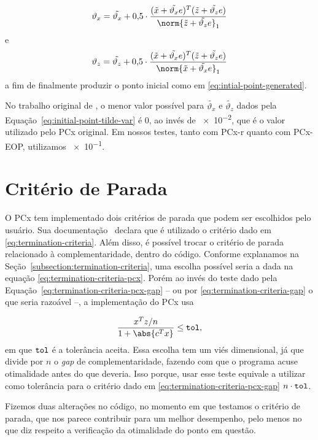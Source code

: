 \begin{equation}
	\label{eq:initial-point-var-x}
\vartheta_{x} = \tilde{\vartheta_x} + \num{0.5}\cdot\dfrac{(\xtil+\tilde{\vartheta_x} e)^{T}(\ztil+\tilde{\vartheta_z} e)}{\norm{\ztil+\tilde{\vartheta_z} e}_{1}} 
\end{equation}
e
\begin{equation}
	\label{eq:initial-point-var-z}
\vartheta_{z} = \tilde{\vartheta_z} + \num{0.5}\cdot\dfrac{(\xtil+\tilde{\vartheta_x} e)^{T}(\ztil+\tilde{\vartheta_z} e)}{\norm{\xtil+\tilde{\vartheta_x} e}_{1}} 
\end{equation}
a fim de finalmente produzir o ponto inicial como em \eqref{eq:intial-point-generated}.

No trabalho original de \textcite{Mehrotra:1992wr}, o menor valor possível para  $\tilde{\vartheta_x}$ e $\tilde{\vartheta_z}$ dados pela Equação~\eqref{eq:initial-point-tilde-var} é $\num{0}$, ao invés de \num{e-2}, 	que é o valor utilizado pelo PCx original. Em nossos testes, tanto com PCx-r quanto com PCx-EOP, utilizamos \num{e-1}.  


\section{Critério de Parada}


O PCx tem implementado dois critérios de parada que podem ser escolhidos pelo usuário. Sua   documentação~\cite{Czyzyk:1998vw} declara que é utilizado o critério dado em \eqref{eq:termination-criteria}.   Além disso, é possível trocar o critério de parada relacionado à complementaridade, dentro do código. Conforme explanamos na Seção~\ref{subsection:termination-criteria}, uma escolha possível seria a dada na equação \eqref{eq:termination-criteria-pcx}. Porém ao invés do teste dado pela Equação~\eqref{eq:termination-criteria-pcx-gap} -- ou por \eqref{eq:termination-criteria-gap} o que seria razoável --, a implementação do PCx usa

\[
\dfrac{x^{T}z/n}{1 + \abs{c^Tx}}\leq
	\tol,
\]
em que $\mathtt{tol}$ é a tolerância aceita. Essa escolha tem um viés dimensional, já que divide por $n$ o \emph{gap} de complementaridade, fazendo com que o programa acuse otimalidade  antes do que deveria. Isso porque, usar esse teste equivale a utilizar como tolerância para o critério dado em \eqref{eq:termination-criteria-pcx-gap} $n\cdot\mathtt{tol}$. 


Fizemos duas  alterações no código, no momento em que testamos o critério de parada, que nos parece  contribuir para um melhor desempenho, pelo menos  no que diz respeito a verificação da otimalidade do ponto em questão. 


